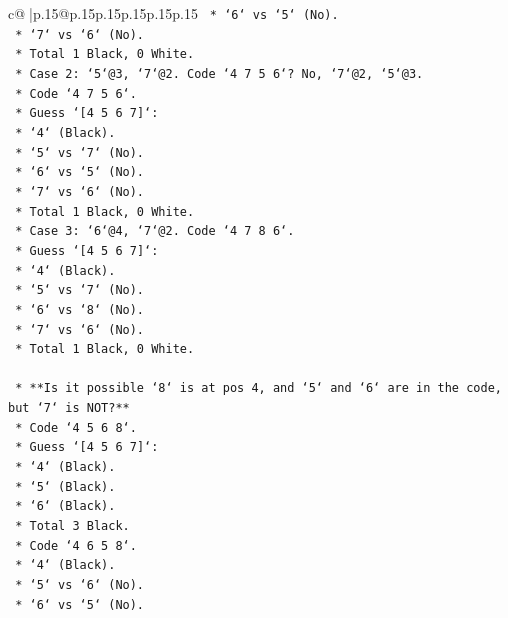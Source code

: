 \documentclass{article}
\begin{document}
{\begin{supertabular}{c@{$\;$}|p{.15\linewidth}@{}p{.15\linewidth}p{.15\linewidth}p{.15\linewidth}p{.15\linewidth}p{.15\linewidth}}
{{{\texttt{                *   `6` vs `5` (No).} \\
\texttt{                *   `7` vs `6` (No).} \\
\texttt{                *   Total 1 Black, 0 White.} \\
\texttt{        *   Case 2: `5`@3, `7`@2. Code `4 7 5 6`? No, `7`@2, `5`@3.} \\
\texttt{            *   Code `4 7 5 6`.} \\
\texttt{            *   Guess `{[}4 5 6 7{]}`:} \\
\texttt{                *   `4` (Black).} \\
\texttt{                *   `5` vs `7` (No).} \\
\texttt{                *   `6` vs `5` (No).} \\
\texttt{                *   `7` vs `6` (No).} \\
\texttt{                *   Total 1 Black, 0 White.} \\
\texttt{        *   Case 3: `6`@4, `7`@2. Code `4 7 8 6`.} \\
\texttt{            *   Guess `{[}4 5 6 7{]}`:} \\
\texttt{                *   `4` (Black).} \\
\texttt{                *   `5` vs `7` (No).} \\
\texttt{                *   `6` vs `8` (No).} \\
\texttt{                *   `7` vs `6` (No).} \\
\texttt{                *   Total 1 Black, 0 White.} \\
\\ 
\texttt{    *   **Is it possible `8` is at pos 4, and `5` and `6` are in the code, but `7` is NOT?**} \\
\texttt{        *   Code `4 5 6 8`.} \\
\texttt{        *   Guess `{[}4 5 6 7{]}`:} \\
\texttt{            *   `4` (Black).} \\
\texttt{            *   `5` (Black).} \\
\texttt{            *   `6` (Black).} \\
\texttt{            *   Total 3 Black.} \\
\texttt{        *   Code `4 6 5 8`.} \\
\texttt{            *   `4` (Black).} \\
\texttt{            *   `5` vs `6` (No).} \\
\texttt{            *   `6` vs `5` (No).} \\
}}}
\end{supertabular}}
\end{document}
